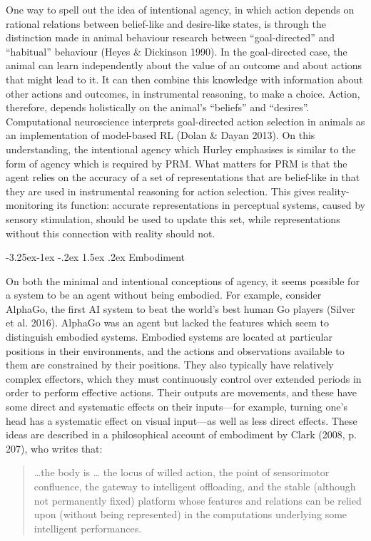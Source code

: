 \documentclass[12pt]{article}
\makeatletter
\newenvironment{myquote}
  {\begin{quote}\leftskip=1cm\rightskip=1cm}
  {\end{quote}}
\newcounter{subsubsubsection}[subsubsection]
\def\subsubsubsection{\@startsection{subsubsubsection}{4}{\z@}%
                                     {-3.25ex\@plus -1ex \@minus -.2ex}%
                                     {1.5ex \@plus .2ex}%
                                     {\normalfont\normalsize\itshape}}
\makeatother
\begin{document}
One way to spell out the idea of intentional agency, in which action depends on rational relations between belief-like and desire-like states, is through the distinction made in animal behaviour research between ``goal-directed'' and ``habitual'' behaviour (Heyes \& Dickinson 1990). In the goal-directed case, the animal can learn independently about the value of an outcome and about actions that might lead to it. It can then combine this knowledge with information about other actions and outcomes, in instrumental reasoning, to make a choice. Action, therefore, depends holistically on the animal’s ``beliefs'' and ``desires''. Computational neuroscience interprets goal-directed action selection in animals as an implementation of model-based RL (Dolan \& Dayan 2013). On this understanding, the intentional agency which Hurley emphasises is similar to the form of agency which is required by PRM. What matters for PRM is that the agent relies on the accuracy of a set of representations that are belief-like in that they are used in instrumental reasoning for action selection. This gives reality-monitoring its function: accurate representations in perceptual systems, caused by sensory stimulation, should be used to update this set, while representations without this connection with reality should not.

{}
\subsubsubsection{Embodiment}

On both the minimal and intentional conceptions of agency, it seems possible for a system to be an agent without being embodied. For example, consider AlphaGo, the first AI system to beat the world’s best human Go players (Silver et al. 2016). AlphaGo was an agent but lacked the features which seem to distinguish embodied systems. Embodied systems are located at particular positions in their environments, and the actions and observations available to them are constrained by their positions. They also typically have relatively complex effectors, which they must continuously control over extended periods in order to perform effective actions. Their outputs are movements, and these have some direct and systematic effects on their inputs—for example, turning one’s head has a systematic effect on visual input—as well as less direct effects. These ideas are described in a philosophical account of embodiment by Clark (2008, p. 207), who writes that:

\begin{myquote}
…the body is … the locus of willed action, the point of sensorimotor confluence, the gateway to intelligent offloading, and the stable (although not permanently fixed) platform whose features and relations can be relied upon (without being represented) in the computations underlying some intelligent performances.
\end{myquote}
\end{document}
